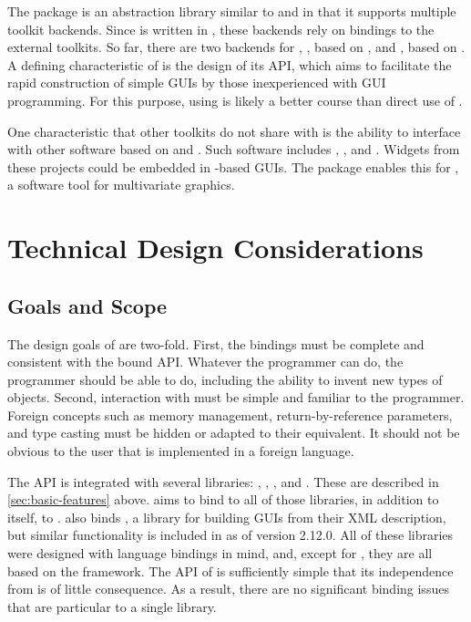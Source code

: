 \documentclass[article]{jss}
\begin{document}
The  package  \citep{gwidgets} is an abstraction library similar to
 and  in that it supports multiple toolkit backends.
Since  is written in , these backends rely on 
bindings to the external toolkits. So far, there are two backends for 
, , based on , and ,
based on . A defining characteristic of  is the
design of its API, which aims to facilitate the rapid construction of simple 
GUIs by those inexperienced with GUI programming. For this purpose, using 
 is likely a better course than direct use of .

One characteristic that other toolkits do not share with  is the 
ability to interface with other software based on  and .
Such software includes , , and . 
Widgets from these projects could be embedded in -based GUIs. The 
package enables this for , a software tool for multivariate graphics. 

\section{Technical Design Considerations}

\subsection{Goals and Scope}

The design goals of  are two-fold. First, the bindings must be
complete and consistent with the bound API. Whatever the  programmer
can do, the  programmer should be able to do, including the ability
to invent new types of objects. Second, interaction with  must
be simple and familiar to the  programmer. Foreign  concepts such
as memory management, return-by-reference parameters, and type casting
must be hidden or adapted to their  equivalent. It should not be
obvious to the user that  is implemented in a foreign language.

The  API is integrated with several libraries: , 
, ,  and . These are described
in \ref{sec:basic-features} above.  aims to bind to all of those
libraries, in addition to  itself, to . 
also binds , a library for building GUIs from their XML description,
but similar functionality is included in  as of version 2.12.0. All
of these libraries were designed with language bindings in mind, and, except
for , they are all based on the  framework. The API of
 is sufficiently simple that its independence from  is
of little consequence. As a result, there are no significant binding issues that
are particular to a single library. 
\end{document}
